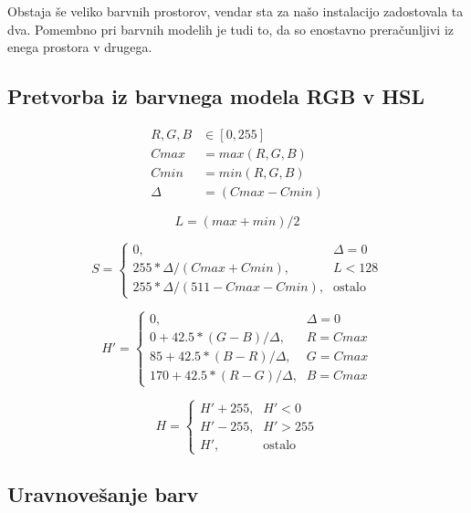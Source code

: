 \documentclass[a4paper, 12pt]{book}
\begin{document}
Obstaja še veliko barvnih prostorov, vendar sta za našo instalacijo 
zadostovala ta dva. Pomembno pri barvnih modelih je tudi to, da so enostavno
preračunljivi iz enega prostora v drugega.


\subsection{Pretvorba iz barvnega modela RGB v HSL}
\label{sec:hslconvert}

\begin{align}
R, G, B &\in [0,255] \nonumber \\
Cmax &= max(R, G, B) \\
Cmin &= min(R, G, B) \\
\Delta &= (Cmax - Cmin)
\end{align}

\begin{equation}
L = (max + min) / 2 \label{eq:hsl_l}
\end{equation}

\begin{equation}
S =
\begin{cases}
    0 \text{,}& \Delta = 0 \\
    255 * \Delta / (Cmax + Cmin) \text{,}& L < 128 \\
    255 * \Delta / (511 - Cmax - Cmin) \text{,}& \text{ostalo}
\end{cases}
\end{equation}

\begin{equation}
H' =
\begin{cases}
    0 \text{,}& \Delta = 0 \\
    0 + 42.5 * (G - B) / \Delta \text{,}& R = Cmax \\
    85 + 42.5 * (B - R) / \Delta \text{,}& G = Cmax \\
    170 + 42.5 * (R - G) / \Delta \text{,}& B = Cmax
\end{cases}
\end{equation}

\begin{equation}
H =
\begin{cases}
    H' + 255 \text{,}& H' < 0 \\
    H' - 255 \text{,}& H' > 255 \\
    H' \text{,}& \text{ostalo}
\end{cases}
\end{equation}


\subsection{Uravnovešanje barv}
\label{sec:obdelavaSlikUravnovesanjeBarv}
\end{document}
